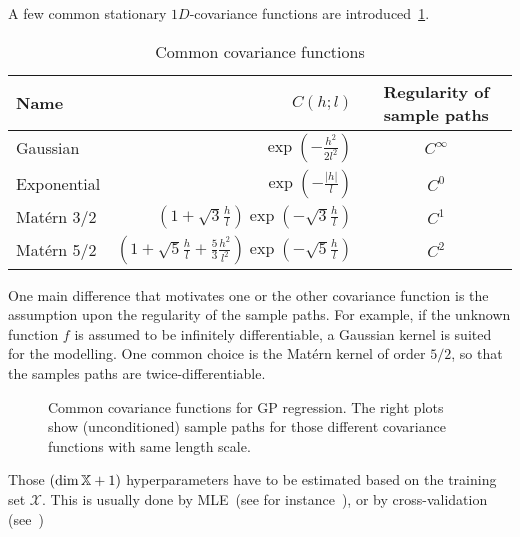 \documentclass[../../Main_ManuscritThese.tex]{subfiles}
\newcommand\imgpath{/home/victor/acadwriting/Manuscrit/Text/Chapter4/img/}
\begin{document}
A few common stationary $1D$-covariance functions are introduced~\cref{tab:common_cov_fc}.

  \begin{table}[ht]
    \centering
    \begin{tabular}{lrc}
      \toprule
      Name & $C(h;l)$ & Regularity of sample paths\\ \midrule
      Gaussian & $\exp\left(- \frac{h^2}{2 l^2}\right)$ & $C^{\infty}$\\
      Exponential &$\exp\left(- \frac{\lvert h \rvert}{l}\right)$ & $C^0$  \\
      Matérn 3/2 & $\left(1 + \sqrt{3}\frac{h}{l}\right)\exp\left(-\sqrt{3}\frac{h}{l}\right)$ & $C^1$\\
      Matérn 5/2 & $\left(1+ \sqrt{5}\frac{h}{l} + \frac{5}{3}\frac{h^2}{l^2}\right) \exp\left(-\sqrt{5}\frac{h}{l}\right)$ & $C^2$\\ \bottomrule
    \end{tabular}
    \caption{\label{tab:common_cov_fc} Common covariance functions}
  \end{table}



  One main difference that motivates one or the other covariance function is the assumption upon the regularity of the sample paths. For example, if the unknown function $f$ is assumed to be infinitely differentiable, a Gaussian kernel is suited for the modelling. One common choice is the Matérn kernel of order $5/2$, so that the samples paths are twice-differentiable.

  
\begin{figure}[ht]
  \centering
  
  \caption{\label{fig:cov_fc_examples} Common covariance functions for GP regression. The right plots show (unconditioned) sample paths for those different covariance functions with same length scale.}
\end{figure}

Those $(\dim \mathbb{X} + 1)$ hyperparameters have to be estimated based on the training set $\mathcal{X}$. This is usually done by MLE~(see for instance~\cite{ribaud_robustness_2019}), or by cross-validation (see~\cite{ginsbourger_note_2009})
\end{document}
